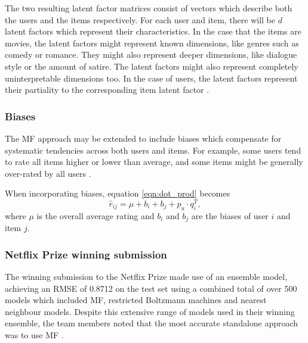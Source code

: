 The two resulting latent factor matrices consist of vectors which describe both the users and the items respectively. For each user and item, there will be $d$ latent factors which represent their characteristics. In the case that the items are movies, the latent factors might represent known dimensions, like genres such as comedy or romance. They might also represent deeper dimensions, like dialogue style or the amount of satire. The latent factors might also represent completely uninterpretable dimensions too. In the case of users, the latent factors represent their partiality to the corresponding item latent factor \parencite{koren2009matrix}.




\subsubsection{Biases}
The MF approach may be extended to include biases which compensate for systematic tendencies across both users and items. For example, some users tend to rate all items higher or lower than average, and some items might be generally over-rated by all users \parencite{koren2009matrix}.

When incorporating biases, equation \ref{eqn:dot_prod} becomes
\begin{equation}
    \hat{r}_{ij} = \mu + b_i + b_j + p_u \cdot q_i^T,
\label{eqn:dot_bias}
\end{equation}
where $\mu$ is the overall average rating and $b_i$ and $b_j$ are the biases of user $i$ and item $j$.

\subsubsection{Netflix Prize winning submission}
The winning submission to the Netflix Prize made use of an ensemble model, achieving an RMSE of 0.8712 on the test set using a combined total of over 500 models which included MF, restricted Boltzmann machines and nearest neighbour models. Despite this extensive range of models used in their winning ensemble, the team members noted that the most accurate standalone approach was to use MF \parencite{netflix_bellkor}. 

